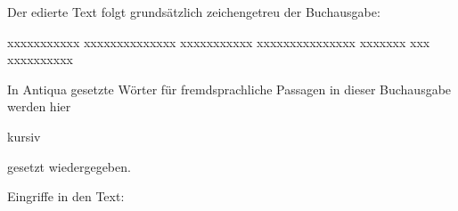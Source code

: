 

Der edierte Text folgt grundsätzlich zeichengetreu der Buchausgabe:

xxxxxxxxxxx xxxxxxxxxxxxxx xxxxxxxxxxx xxxxxxxxxxxxxxx xxxxxxx
xxx xxxxxxxxxx

In Antiqua gesetzte Wörter für fremdsprachliche Passagen in dieser
Buchausgabe werden hier \begin{it}kursiv\end{it} gesetzt wiedergegeben.

Eingriffe in den Text:

\theendnotes
